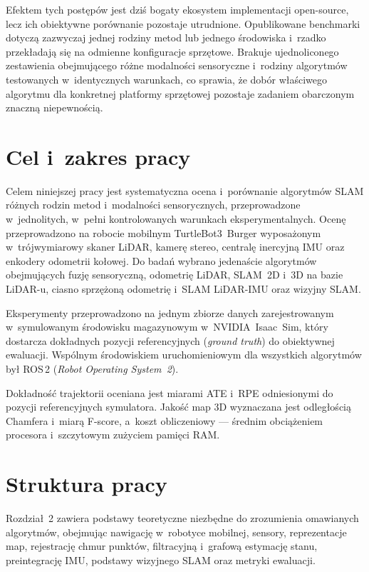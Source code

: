 Efektem tych postępów jest dziś bogaty ekosystem implementacji open-source,
lecz ich obiektywne porównanie pozostaje utrudnione.
Opublikowane benchmarki dotyczą zazwyczaj jednej rodziny metod lub jednego
środowiska i~rzadko przekładają się na odmienne konfiguracje sprzętowe.
Brakuje ujednoliconego zestawienia obejmującego różne modalności sensoryczne
i~rodziny algorytmów testowanych w~identycznych warunkach, co sprawia,
że dobór właściwego algorytmu dla konkretnej platformy sprzętowej pozostaje
zadaniem obarczonym znaczną niepewnością.

\section{Cel i~zakres pracy}

Celem niniejszej pracy jest systematyczna ocena i~porównanie algorytmów SLAM
różnych rodzin metod i~modalności sensorycznych, przeprowadzone w~jednolitych,
w~pełni kontrolowanych warunkach eksperymentalnych.
Ocenę przeprowadzono na robocie mobilnym TurtleBot3~Burger wyposażonym
w~trójwymiarowy skaner LiDAR, kamerę stereo, centralę inercyjną IMU
oraz enkodery odometrii kołowej.
Do badań wybrano jedenaście algorytmów obejmujących fuzję sensoryczną,
odometrię LiDAR, SLAM~2D i~3D na bazie LiDAR-u, ciasno sprzężoną odometrię
i~SLAM LiDAR-IMU oraz wizyjny SLAM.

Eksperymenty przeprowadzono na jednym zbiorze danych zarejestrowanym
w~symulowanym środowisku magazynowym w~NVIDIA~Isaac~Sim,
który dostarcza dokładnych pozycji referencyjnych (\textit{ground truth})
do obiektywnej ewaluacji.
Wspólnym środowiskiem uruchomieniowym dla wszystkich algorytmów był
ROS\,2 (\textit{Robot Operating System~2}).

Dokładność trajektorii oceniana jest miarami ATE i~RPE
odniesionymi do pozycji referencyjnych symulatora.
Jakość map 3D wyznaczana jest odległością Chamfera i~miarą F-score,
a~koszt obliczeniowy --- średnim obciążeniem procesora i~szczytowym
zużyciem pamięci RAM.

\section{Struktura pracy}

\begingroup
\setlength{\parskip}{2pt}
\setlength{\parindent}{1.5em}

Rozdział~2 zawiera podstawy teoretyczne niezbędne do zrozumienia omawianych
algorytmów, obejmując nawigację w~robotyce mobilnej, sensory, reprezentacje map,
rejestrację chmur punktów, filtracyjną i~grafową estymację stanu, preintegrację
IMU, podstawy wizyjnego SLAM oraz metryki ewaluacji.

